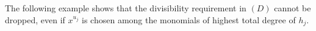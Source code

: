 \documentclass[11pt]{amsart}
\theoremstyle{definition}
\theoremstyle{remark}
\numberwithin{equation}{theorem}
\newcommand{\Aut}{\operatorname{Aut}}
\begin{document}

The following example shows that the divisibility requirement in $(D)$ cannot be dropped, even
if $x^{u_j}$ is chosen among the monomials of highest total degree of $h_j$.
\end{document}
